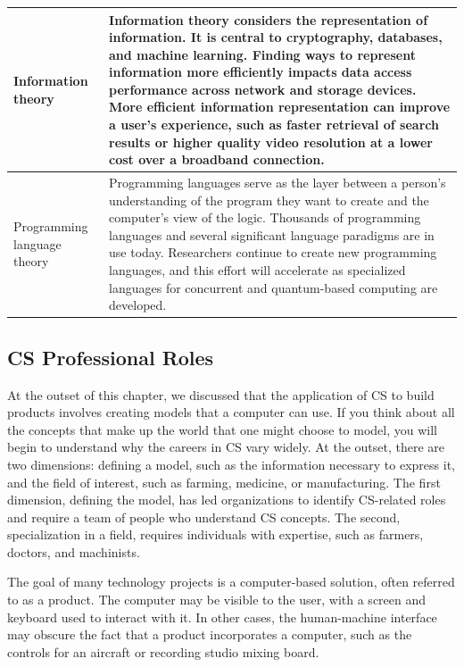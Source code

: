 \begin{longtable}[H]{p{.8in}|p{3.6in}}
	\hline
	\Tstrut Information theory & Information theory considers the representation of information. It is central to cryptography, databases, and machine learning. Finding ways to represent information more efficiently impacts data access performance across network and storage devices. More efficient information representation can improve a user's experience, such as faster retrieval of search results or higher quality video resolution at a lower cost over a broadband connection.\\
	\hline
	\Tstrut Programming language theory & Programming languages serve as the layer between a person's understanding of the program they want to create and the computer's view of the logic. Thousands of programming languages and several significant language paradigms are in use today. Researchers continue to create new programming languages, and this effort will accelerate as specialized languages for concurrent and quantum-based computing are developed.\\
	\bottomrule
\end{longtable}


\subsection{CS Professional Roles}

At the outset of this chapter, we discussed that the application of CS to build products involves creating models that a computer can use. If you think about all the concepts that make up the world that one might choose to model, you will begin to understand why the careers in CS vary widely. At the outset, there are two dimensions: defining a model, such as the information necessary to express it, and the field of interest, such as farming, medicine, or manufacturing. The first dimension, defining the model, has led organizations to identify CS-related roles and require a team of people who understand CS concepts. The second, specialization in a field, requires individuals with expertise, such as farmers, doctors, and machinists.

The goal of many technology projects is a computer-based solution, often referred to as a product. The computer may be visible to the user, with a screen and keyboard used to interact with it. In other cases, the human-machine interface may obscure the fact that a product incorporates a computer, such as the controls for an aircraft or recording studio mixing board.

